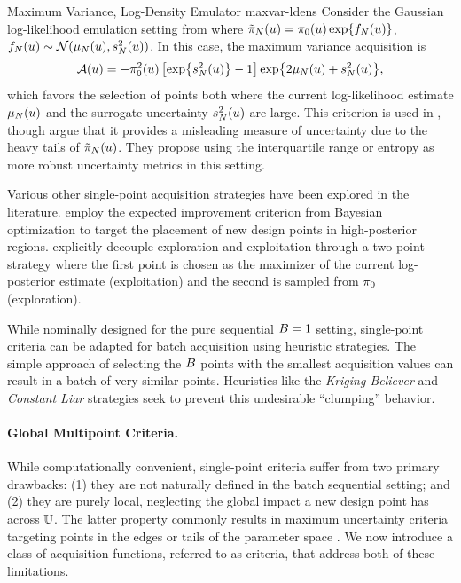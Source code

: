 \documentclass[12pt]{article}
\begin{document}
\begin{examplebox}
{Maximum Variance, Log-Density Emulator}
{maxvar-ldens}
Consider the Gaussian log-likelihood emulation setting from 
where ${\tilde{\pi}}_{N}(u) = \pi_0(u) \exp\mathopen{}\left\{f_{N}(u)\right\}\mathclose{}$, 
$f_{N}(u) \sim \mathcal{N}(\mu_{N}(u), s^2_{N}(u))$.
In this case, the maximum variance acquisition is
\begin{equation}
\mathcal{A}(u) = -\pi_0^2(u) \left[\exp\mathopen{}\left\{s^2_{N}(u)\right\}\mathclose{} - 1 \right] \exp\mathopen{}\left\{2\mu_{N}(u) + s^2_{N}(u)\right\}\mathclose{},
\end{equation}
which favors the selection of points both where the current log-likelihood estimate $\mu_{N}(u)$ and the surrogate 
uncertainty $s^2_{N}(u)$ are large. This criterion is used in 
\citet{Lueckmann2018LikelihoodfreeIW,Kandasamy_2017,AlawiehIterativeGP}, though
\citep{VehtariParallelGP,wang2018adaptive} argue that it provides a misleading measure of uncertainty due to the 
heavy tails of ${\tilde{\pi}}_{N}(u)$. They propose using the interquartile range or entropy as more robust 
uncertainty metrics in this setting.
\end{examplebox}

Various other single-point acquisition strategies have been explored in the literature. 
\citet{Takhtaganov2018AdaptiveBayesianGP} employ the expected improvement
criterion from Bayesian optimization to target the placement of new design points in high-posterior regions.
\citet{gp_surrogates_random_exploration} explicitly decouple exploration and exploitation through
a two-point strategy where the first point is chosen as the maximizer of the current log-posterior
estimate (exploitation) and the second is sampled from $\pi_0$ (exploration).

While nominally designed for the pure sequential $B = 1$ setting, single-point criteria can be 
adapted for batch acquisition using heuristic strategies. The simple approach of selecting the $B$
points with the smallest acquisition values can result in a batch of very similar points. Heuristics 
like the \textit{Kriging Believer} and \textit{Constant Liar} strategies \citep{Ginsbourger2010} seek
to prevent this undesirable ``clumping'' behavior.

\paragraph{Global Multipoint Criteria.}
While computationally convenient, single-point criteria suffer from two primary drawbacks: (1) they are not 
naturally defined in the batch sequential setting; and (2) they are purely local, neglecting the global impact a 
new design point has across $\mathbb{U}$. The latter property commonly results in maximum uncertainty 
criteria targeting points in the edges or tails of the parameter space . We now introduce a class 
of acquisition functions, referred to as  criteria, that address 
both of these limitations.
\end{document}
